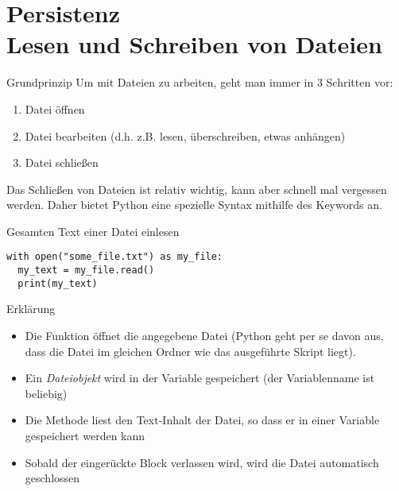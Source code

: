 \section{Persistenz \\ \footnotesize Lesen und Schreiben von Dateien}

\begin{frame}
	
\begin{block}{Grundprinzip}
\vspace{2pt}
Um mit Dateien zu arbeiten, geht man immer in 3 Schritten vor:
\pause 
\begin{enumerate}
	\item<2-> Datei öffnen 
	\item<3-> Datei bearbeiten (d.h. z.B. lesen, überschreiben, etwas anhängen)
	\item<4-> Datei schließen
\end{enumerate}
\pause \pause \pause
Das Schließen von Dateien ist relativ wichtig, kann aber schnell mal vergessen werden. Daher bietet Python eine spezielle Syntax mithilfe des Keywords  an. 
\end{block}
\end{frame}


\begin{fragile}
\begin{block}{Gesamten Text einer Datei einlesen}
\vspace{2pt}
\pause 
\begin{verbatim}
with open("some_file.txt") as my_file:
  my_text = my_file.read()
  print(my_text)
\end{verbatim}

\pause
\vspace{12pt}

\begin{exampleblock}{Erklärung}
\vspace{2pt}
\begin{itemize}[<+->]
	\item Die Funktion  öffnet die angegebene Datei (Python geht per se davon aus, dass die Datei im gleichen Ordner wie das ausgeführte Skript liegt).
	\item Ein \emph{Dateiobjekt} wird in der Variable  gespeichert (der Variablenname ist beliebig)
	\item Die Methode  liest den Text-Inhalt der Datei, so dass er in einer Variable gespeichert werden kann 
	\item Sobald der eingerückte Block verlassen wird, wird die Datei automatisch geschlossen
\end{itemize}
\end{exampleblock}

\end{block}
\end{fragile}

